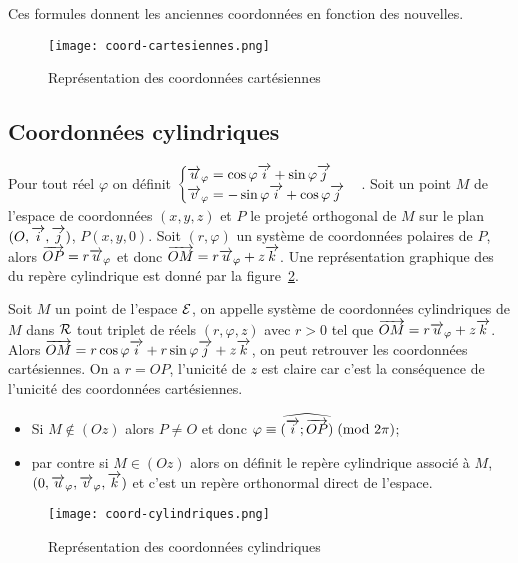 \danger Ces formules donnent les \og{}anciennes\fg{} coordonnées en fonction des
\og{}nouvelles\fg{}.

\begin{figure}
  \centering
  \texttt{[image: coord-cartesiennes.png]}
  \caption{Représentation des coordonnées cartésiennes}
  \label{fig:repcart}
\end{figure}

\subsection{Coordonnées cylindriques}
\label{subsec:coordcyl}
Pour tout réel \(\varphi\) on définit \(
\begin{cases}
  \overrightarrow{u}_\varphi = \cos\varphi\overrightarrow{i} + \sin\varphi\overrightarrow{j} \\ \overrightarrow{v}_\varphi = -\sin\varphi\overrightarrow{i}
  + \cos\varphi\overrightarrow{j}
\end{cases}\).  Soit un point \(M\) de l'espace de coordonnées \((x, y, z)\) et
\(P\) le projeté orthogonal de \(M\) sur le plan \((O,\overrightarrow{i},\overrightarrow{j})\), \(P(x, y, 0)\). Soit
\((r, \varphi)\) un système de coordonnées polaires de \(P\), alors \(\overrightarrow{OP}
= r\overrightarrow{u}_\varphi\) et donc \(\overrightarrow{OM} = r\overrightarrow{u}_\varphi + z\overrightarrow{k}\). Une représentation
graphique des du repère cylindrique est donné par la figure~\ref{fig:repcyl}.

\begin{defdef}
  Soit \(M\) un point de l'espace \(\mathcal{E}\), on appelle système de coordonnées
  cylindriques de \(M\) dans \(\mathcal{R}\) tout triplet de réels \((r, \varphi, z)\)
  avec \(r>0\) tel que \(\overrightarrow{OM} = r\overrightarrow{u}_\varphi + z\overrightarrow{k}\). Alors \(\overrightarrow{OM} =
  r\cos\varphi\overrightarrow{i} + r\sin\varphi\overrightarrow{j} + z\overrightarrow{k}\), on peut retrouver les coordonnées
  cartésiennes. On a \(r = OP\), l'unicité de \(z\) est claire car c'est la
  conséquence de l'unicité des coordonnées cartésiennes.  \begin{itemize}
    \item Si \(M\notin(Oz)\) alors \(P\neq O\) et donc
      \(\varphi \equiv \widehat{(\overrightarrow{i};\overrightarrow{OP})}\!\pmod {2\pi}\);
    \item par contre si \(M\in(Oz)\) alors on définit le repère cylindrique
      associé à \(M\), \((0, \overrightarrow{u}_\varphi, \overrightarrow{v}_\varphi, \overrightarrow{k})\) et c'est un repère
      orthonormal direct de l'espace.
  \end{itemize}
\end{defdef}

\begin{figure}
  \centering
  \texttt{[image: coord-cylindriques.png]}
  \caption{Représentation des coordonnées cylindriques}
  \label{fig:repcyl}
\end{figure}

